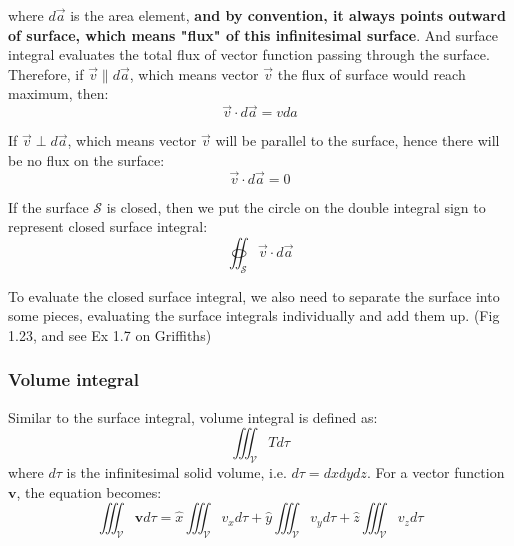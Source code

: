 \documentclass[12pt,a4paper,twoside]{article}
\numberwithin{equation}{section}
\begin{document}
	where \(d\overrightarrow{a}\) is the area element, \textbf{and by convention, it always points outward of surface, which means "flux" of this infinitesimal surface}. And surface integral evaluates the total flux of vector function passing through the surface.\\
	
	\noindent Therefore, if \(\overrightarrow{v}\parallel d\overrightarrow{a}\), which means vector \(\overrightarrow{v}\) the flux of surface would reach maximum, then:
	\[\overrightarrow{v}\cdot d\overrightarrow{a}=vda\]
	
	If \(\overrightarrow{v}\perp d\overrightarrow{a}\), which means vector \(\overrightarrow{v}\) will be parallel to the surface, hence there will be no flux on the surface:
	\[\overrightarrow{v}\cdot d\overrightarrow{a}=0\]
	
	If the surface \(\mathcal{S}\) is closed, then we put the circle on the double integral sign to represent closed surface integral:
	\[\oiint_\mathcal{S} \overrightarrow{v} \cdot d\overrightarrow{a}\]
	
	To evaluate the closed surface integral, we also need to separate the surface into some pieces, evaluating the surface integrals individually and add them up. (Fig 1.23, and see Ex 1.7 on Griffiths)
	\subsubsection{Volume integral}
	Similar to the surface integral, volume integral is defined as:
	\begin{equation}
		\iiint_\mathcal{V} T d\tau
	\end{equation}
	where \(d\tau \) is the infinitesimal solid volume, i.e. \(d\tau=dxdydz\). For a vector function \(\textbf{v}\), the equation becomes:
	\[\iiint_\mathcal{V}\textbf{v} d\tau=\hat{x}\iiint_\mathcal{V} v_xd\tau+\hat{y}\iiint_\mathcal{V}v_yd\tau+\hat{z}\iiint_\mathcal{V}v_zd\tau\]
	
	
\end{document}
